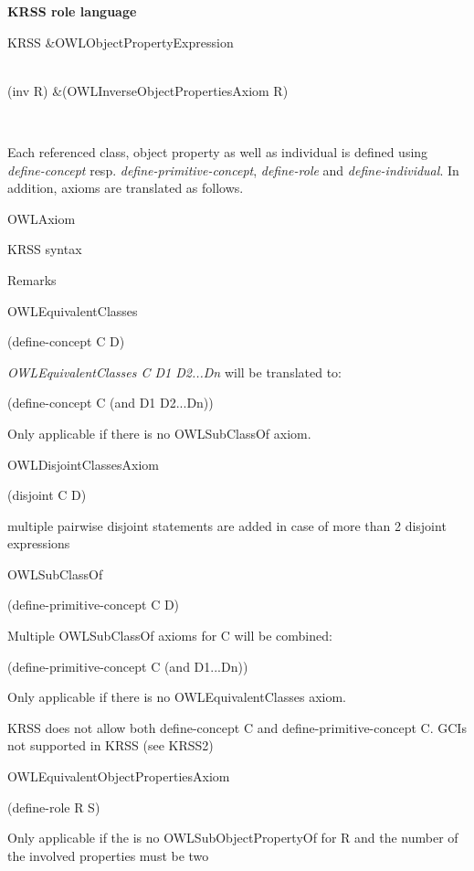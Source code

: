 {\bfseries K\-R\-S\-S role language} \begin{TabularC}{2}
\hline
K\-R\-S\-S &O\-W\-L\-Object\-Property\-Expression  

\\
(inv R) &(O\-W\-L\-Inverse\-Object\-Properties\-Axiom R)  

\\
\end{TabularC}


Each referenced class, object property as well as individual is defined using {\itshape define-\/concept} resp. {\itshape define-\/primitive-\/concept}, {\itshape define-\/role} and {\itshape define-\/individual}. In addition, axioms are translated as follows. 

\begin{TabularC}{0}
\hline
\end{TabularC}
O\-W\-L\-Axiom 

K\-R\-S\-S syntax 

Remarks 

O\-W\-L\-Equivalent\-Classes 

(define-\/concept C D) 

{\itshape O\-W\-L\-Equivalent\-Classes C D1 D2...Dn} will be translated to\-:\par
 (define-\/concept C (and D1 D2...Dn)) 

Only applicable if there is no O\-W\-L\-Sub\-Class\-Of axiom. 

O\-W\-L\-Disjoint\-Classes\-Axiom 

(disjoint C D) 

multiple pairwise disjoint statements are added in case of more than 2 disjoint expressions  

O\-W\-L\-Sub\-Class\-Of 

(define-\/primitive-\/concept C D) 

Multiple O\-W\-L\-Sub\-Class\-Of axioms for C will be combined\-: \par
 (define-\/primitive-\/concept C (and D1...Dn)) 

Only applicable if there is no O\-W\-L\-Equivalent\-Classes axiom.\par
 K\-R\-S\-S does not allow both define-\/concept C and define-\/primitive-\/concept C. G\-C\-Is not supported in K\-R\-S\-S (see K\-R\-S\-S2)   

O\-W\-L\-Equivalent\-Object\-Properties\-Axiom 

(define-\/role R S) 

Only applicable if the is no O\-W\-L\-Sub\-Object\-Property\-Of for R and the number of the involved properties must be two  


